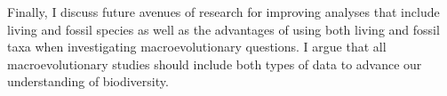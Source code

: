 \documentclass[a4paper,11pt]{article}
\begin{document}
Finally, I discuss future avenues of research for improving analyses that include living and fossil species as well as the advantages of using both living and fossil taxa when investigating macroevolutionary questions. 
I argue that all macroevolutionary studies should include both types of data to advance our understanding of biodiversity.
\end{document}

